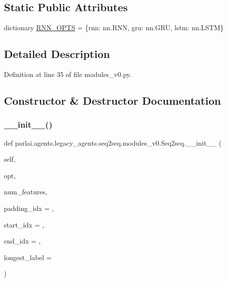 \subsection*{Static Public Attributes}
\begin{DoxyCompactItemize}
\item 
dictionary \hyperlink{classparlai_1_1agents_1_1legacy__agents_1_1seq2seq_1_1modules__v0_1_1Seq2seq_af1a1661b40d32cbcfcf82f951fc46d16}{R\+N\+N\+\_\+\+O\+P\+TS} = \{\textquotesingle{}rnn\textquotesingle{}\+: nn.\+R\+NN, \textquotesingle{}gru\textquotesingle{}\+: nn.\+G\+RU, \textquotesingle{}lstm\textquotesingle{}\+: nn.\+L\+S\+TM\}
\end{DoxyCompactItemize}


\subsection{Detailed Description}


Definition at line 35 of file modules\+\_\+v0.\+py.



\subsection{Constructor \& Destructor Documentation}
\mbox{\label{classparlai_1_1agents_1_1legacy__agents_1_1seq2seq_1_1modules__v0_1_1Seq2seq_a18cac7233148ad9fd4e6a0ea290d4dbc}} 
\subsubsection{\texorpdfstring{\+\_\+\+\_\+init\+\_\+\+\_\+()}{\_\_init\_\_()}}
{\footnotesize\ttfamily def parlai.\+agents.\+legacy\+\_\+agents.\+seq2seq.\+modules\+\_\+v0.\+Seq2seq.\+\_\+\+\_\+init\+\_\+\+\_\+ (\begin{DoxyParamCaption}\item[{}]{self,  }\item[{}]{opt,  }\item[{}]{num\+\_\+features,  }\item[{}]{padding\+\_\+idx = {},  }\item[{}]{start\+\_\+idx = {},  }\item[{}]{end\+\_\+idx = {},  }\item[{}]{longest\+\_\+label = {} }\end{DoxyParamCaption})}



